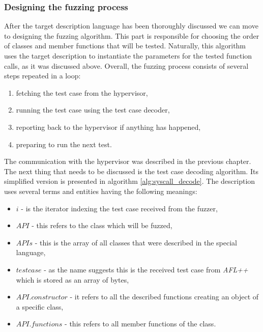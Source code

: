\subsubsection{Designing the fuzzing process} \label{sec:testcase}
After the target description language has been thoroughly discussed we can move to designing the fuzzing algorithm. This part is responsible for choosing the order of classes and member functions that will be tested. Naturally, this algorithm uses the target description to instantiate the parameters for the tested function calls, as it was discussed above.
Overall, the fuzzing process consists of several steps repeated in a loop:
\begin{enumerate}
    \item fetching the test case from the hypervisor,
    \item running the test case using the test case decoder,
    \item reporting back to the hypervisor if anything has happened,
    \item preparing to run the next test.
\end{enumerate}
The communication with the hypervisor was described in the previous chapter. The next thing that needs to be discussed is the test case decoding algorithm. Its simplified version is presented in algorithm \ref{alg:syscall_decode}. The description uses several terms and entities having the following meanings:
\begin{itemize}
    \item $i$ - is the iterator indexing the test case received from the fuzzer,
    \item $API$ - this refers to the class which will be fuzzed,
    \item $APIs$ - this is the array of all classes that were described in the special language,
    \item $testcase$ - as the name suggests this is the received test case from \textit{AFL++} which is stored as an array of bytes,
    \item $API.constructor$ - it refers to all the described functions creating an object of a specific class,
    \item $API.functions$ - this refers to all member functions of the class.
\end{itemize}
